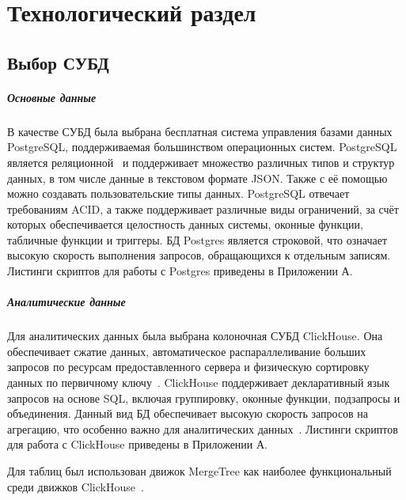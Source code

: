 \chapter{Технологический раздел}


\section{Выбор СУБД}
\paragraph{Основные данные}\mbox{}

В качестве СУБД была выбрана бесплатная система управления базами данных PostgreSQL, поддерживаемая большинством операционных систем. PostgreSQL является реляционной~\cite{bib21} и поддерживает множество различных типов и структур данных, в том числе данные в текстовом формате JSON. Также с её помощью можно создавать пользовательские типы данных. PostgreSQL отвечает требованиям ACID, а также поддерживает различные виды ограничений, за счёт которых обеспечивается целостность данных системы, оконные функции, табличные функции и триггеры. БД Postgres является строковой, что означает высокую скорость выполнения запросов, обращающихся к отдельным записям. Листинги скриптов для работы с Postgres приведены в Приложении А.

\paragraph{Аналитические данные}\mbox{}

Для аналитических данных была выбрана колоночная СУБД ClickHouse. Она обеспечивает сжатие данных, автоматическое распараллеливание больших запросов по ресурсам предоставленного сервера и физическую сортировку данных по первичному ключу~\cite{bib22}. ClickHouse поддерживает декларативный язык запросов на основе SQL, включая группировку, оконные функции, подзапросы и объединения. Данный вид БД обеспечивает высокую скорость запросов на агрегацию, что особенно важно для аналитических данных~\cite{bib18}. Листинги скриптов для работа с ClickHouse приведены в Приложении А.

Для таблиц был использован движок MergeTree как наиболее функциональный среди движков ClickHouse~\cite{bib30}. 

